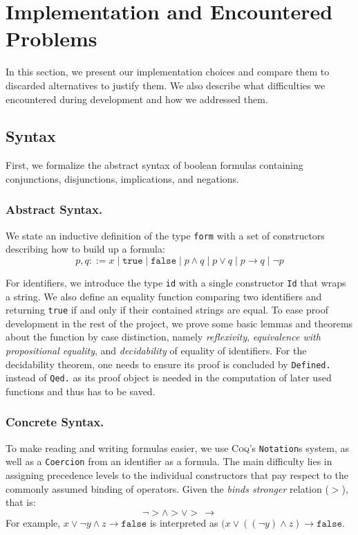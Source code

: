 \section{Implementation and Encountered Problems}\label{sec:impl}

In this section, we present our implementation choices and compare them to discarded alternatives to justify them. 
We also describe what difficulties we encountered during development and how we addressed them.

\subsection{Syntax}

First, we formalize the abstract syntax of boolean formulas containing conjunctions, disjunctions, implications, and negations. 

\subsubsection{Abstract Syntax.}

We state an inductive definition of the type \texttt{form} with a set of constructors describing how to build up a formula:
\begin{equation}
    p, q ::= x\;|\;\texttt{true}\;|\;\texttt{false}\;|\;p \land q\;|\;p \lor q\;|\;p \rightarrow q\;|\;\neg p
\end{equation}

For identifiers, we introduce the type \texttt{id} with a single constructor \texttt{Id} that wraps a string. 
We also define an equality function comparing two identifiers and returning \texttt{true} if and only if their contained strings are equal. To ease proof development in the rest of the project, we prove some basic lemmas and theorems about the function by case distinction, namely \emph{reflexivity}, \emph{equivalence with propositional equality}, and \emph{decidability} of equality of identifiers.
For the decidability theorem, one needs to ensure its proof is concluded by \texttt{Defined.} instead of \texttt{Qed.} as its proof object is needed in the computation of later used functions and thus has to be saved.

\subsubsection{Concrete Syntax.}

To make reading and writing formulas easier, we use \textsc{Coq}'s \texttt{Notation}s system, as well as a \texttt{Coercion} from an identifier as a formula. 
The main difficulty lies in assigning precedence levels to the individual constructors that pay respect to the commonly assumed binding of operators. 
Given the \emph{binds stronger} relation ($>$), that is:
\begin{equation}
    \neg > \land > \lor >\,\rightarrow
\end{equation}
For example, $x \lor \neg y \land z \rightarrow \texttt{false}$ is interpreted as $(x \lor ((\neg y) \land z) \rightarrow \texttt{false}$. 

